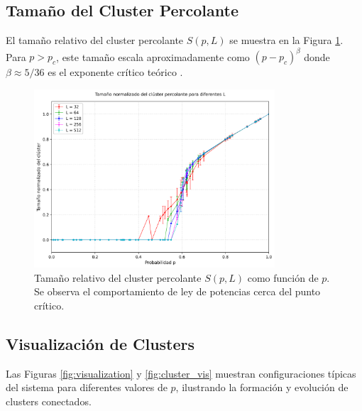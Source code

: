 \documentclass[11pt,a4paper]{article}
\begin{document}
\subsection{Tamaño del Cluster Percolante}

El tamaño relativo del cluster percolante $S(p,L)$ se muestra en la Figura \ref{fig:cluster_size}. Para $p > p_c$, este tamaño escala aproximadamente como $(p - p_c)^{\beta}$ donde $\beta \approx 5/36$ es el exponente crítico teórico \cite{stauffer1994introduction}.

\begin{figure}[H]
    \centering
    \includegraphics[width=0.8\textwidth]{../figures/Cluster_all_L.png}
    \caption{Tamaño relativo del cluster percolante $S(p,L)$ como función de $p$. Se observa el comportamiento de ley de potencias cerca del punto crítico.}
    \label{fig:cluster_size}
\end{figure}

\subsection{Visualización de Clusters}

Las Figuras \ref{fig:visualization} y \ref{fig:cluster_vis} muestran configuraciones típicas del sistema para diferentes valores de $p$, ilustrando la formación y evolución de clusters conectados.
\end{document}
